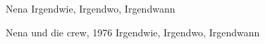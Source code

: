 \documentclass[a4paper]{article}
\begin{document}
	\begin{mytcbox}{Nena}
		Irgendwie, Irgendwo, Irgendwann
	\end{mytcbox}
	
	\begin{mytcbox2}{Nena und die crew, 1976}
		Irgendwie, Irgendwo, Irgendwann
	\end{mytcbox2}
%	
\end{document}
